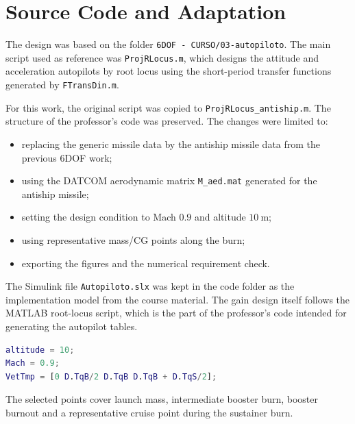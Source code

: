 \section{Source Code and Adaptation}

The design was based on the folder \texttt{6DOF - CURSO/03-autopiloto}. The main script used as reference was \texttt{ProjRLocus.m}, which designs the attitude and acceleration autopilots by root locus using the short-period transfer functions generated by \texttt{FTransDin.m}.

For this work, the original script was copied to \texttt{ProjRLocus\_antiship.m}. The structure of the professor's code was preserved. The changes were limited to:

\begin{itemize}
    \item replacing the generic missile data by the antiship missile data from the previous 6DOF work;
    \item using the DATCOM aerodynamic matrix \texttt{M\_aed.mat} generated for the antiship missile;
    \item setting the design condition to Mach \(0.9\) and altitude \(10~\text{m}\);
    \item using representative mass/CG points along the burn;
    \item exporting the figures and the numerical requirement check.
\end{itemize}

The Simulink file \texttt{Autopiloto.slx} was kept in the code folder as the implementation model from the course material. The gain design itself follows the MATLAB root-locus script, which is the part of the professor's code intended for generating the autopilot tables.

\begin{lstlisting}[language=Matlab]
% Antiship missile design condition used in the assignment.
altitude = 10;
Mach = 0.9;
VetTmp = [0 D.TqB/2 D.TqB D.TqB + D.TqS/2];
\end{lstlisting}

The selected points cover launch mass, intermediate booster burn, booster burnout and a representative cruise point during the sustainer burn.
